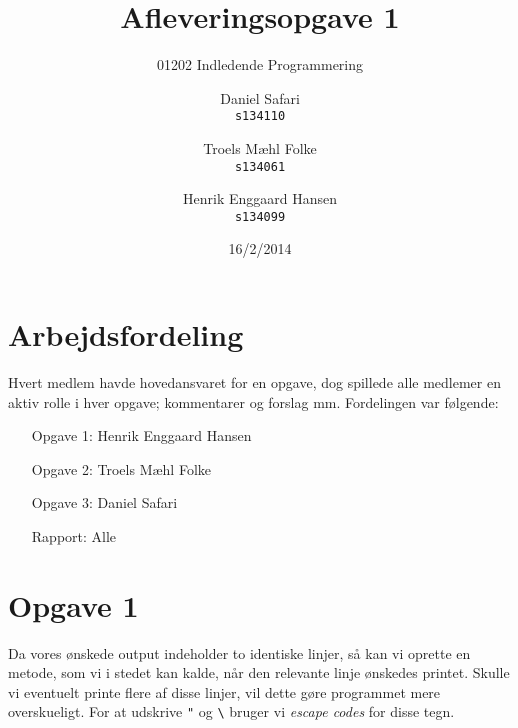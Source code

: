 \documentclass{scrartcl}
\newcommand\code[1]{\texttt{#1}}
\begin{document}

\title{Afleveringsopgave 1}
\subtitle{01202 Indledende Programmering}
\author{
  Daniel Safari\\
  \texttt{s134110}
  \and
  Troels Mæhl Folke\\
  \texttt{s134061}
   \and
  Henrik Enggaard Hansen\\
  \texttt{s134099}
}
\date{16/2/2014}
\maketitle
\thispagestyle{empty}
\setcounter{page}{0}
\null
\vfill
\section*{Arbejdsfordeling}
Hvert medlem havde hovedansvaret for en opgave, dog spillede alle medlemer en aktiv rolle i hver opgave; kommentarer og forslag mm. Fordelingen var følgende:
\begin{itemize}
\setlength{\itemindent}{3em}
\item[Opgave 1:] Henrik Enggaard Hansen
\item[Opgave 2:] Troels Mæhl Folke
\item[Opgave 3:] Daniel Safari
\item[Rapport:]  Alle
\end{itemize}
\newpage
\section*{Opgave 1}
Da vores ønskede output indeholder to identiske linjer, så kan vi oprette en metode, som vi i stedet kan kalde, når den relevante linje ønskedes printet. Skulle vi eventuelt printe flere af disse linjer, vil dette gøre programmet mere overskueligt. For at udskrive \code{"} og \code{\textbackslash} bruger vi \emph{escape codes} for disse tegn.
\end{document}
